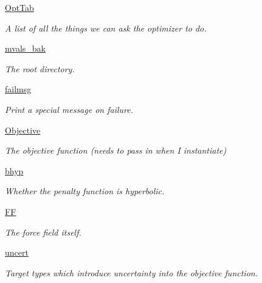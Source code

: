\begin{DoxyCompactItemize}
\item 
\hyperlink{classforcebalance_1_1optimizer_1_1Optimizer_a30e7e28bf0af3cffc94aa51a58a3d345}{Opt\-Tab}
\begin{DoxyCompactList}\small\item\em A list of all the things we can ask the optimizer to do. \end{DoxyCompactList}\item 
\hyperlink{classforcebalance_1_1optimizer_1_1Optimizer_a5701ece0fa7290f416ce78bb6d7f012d}{mvals\-\_\-bak}
\begin{DoxyCompactList}\small\item\em The root directory. \end{DoxyCompactList}\item 
\hyperlink{classforcebalance_1_1optimizer_1_1Optimizer_a5b5df74499cdf8220571a83651b8e8f8}{failmsg}
\begin{DoxyCompactList}\small\item\em Print a special message on failure. \end{DoxyCompactList}\item 
\hyperlink{classforcebalance_1_1optimizer_1_1Optimizer_a485c636c02ff86bb7709a44582c7693e}{Objective}
\begin{DoxyCompactList}\small\item\em The objective function (needs to pass in when I instantiate) \end{DoxyCompactList}\item 
\hyperlink{classforcebalance_1_1optimizer_1_1Optimizer_a83d94779674511a9d31b780b07ea54fb}{bhyp}
\begin{DoxyCompactList}\small\item\em Whether the penalty function is hyperbolic. \end{DoxyCompactList}\item 
\hyperlink{classforcebalance_1_1optimizer_1_1Optimizer_a873d6c3dfc5351d162613b596850af75}{F\-F}
\begin{DoxyCompactList}\small\item\em The force field itself. \end{DoxyCompactList}\item 
\hyperlink{classforcebalance_1_1optimizer_1_1Optimizer_ae52c7b868b40920a62001e30ea1e8202}{uncert}
\begin{DoxyCompactList}\small\item\em Target types which introduce uncertainty into the objective function. \end{DoxyCompactList}\item 

\end{DoxyCompactItemize}
